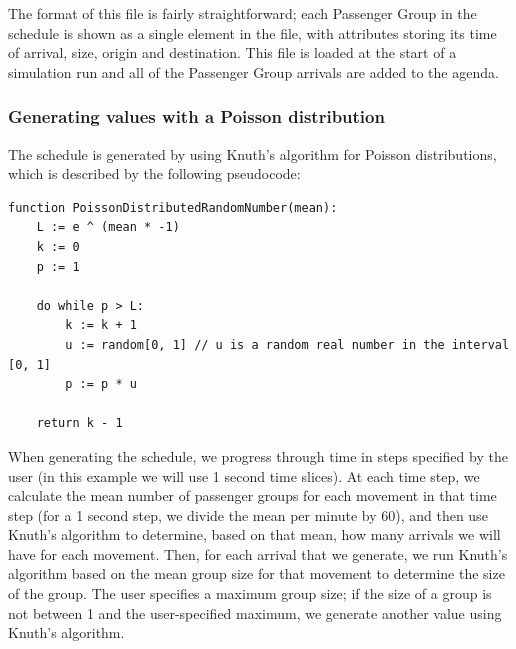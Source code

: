 \documentclass{UoYCSproject}
\begin{document}
The format of this file is fairly straightforward; each Passenger Group in the schedule is shown as a single element in the file, with attributes storing its time of arrival, size, origin and destination.  This file is loaded at the start of a simulation run and all of the Passenger Group arrivals are added to the agenda.

\subsubsection{Generating values with a Poisson distribution}

The schedule is generated by using Knuth's algorithm for Poisson distributions, which is described by the following pseudocode:  \citep{Ahrens1974, Atkinson1979}

\begin{lstlisting}
function PoissonDistributedRandomNumber(mean):
	L := e ^ (mean * -1)
	k := 0
	p := 1

	do while p > L:
		k := k + 1
		u := random[0, 1] // u is a random real number in the interval [0, 1]
		p := p * u

	return k - 1
\end{lstlisting}

When generating the schedule, we progress through time in steps specified by the user (in this example we will use 1 second time slices).  At each time step, we calculate the mean number of passenger groups for each movement in that time step (for a 1 second step, we divide the mean per minute by 60), and then use Knuth's algorithm to determine, based on that mean, how many arrivals we will have for each movement.  Then, for each arrival that we generate, we run Knuth's algorithm based on the mean group size for that movement to determine the size of the group.  The user specifies a maximum group size; if the size of a group is not between 1 and the user-specified maximum, we generate another value using Knuth's algorithm.
\end{document}
